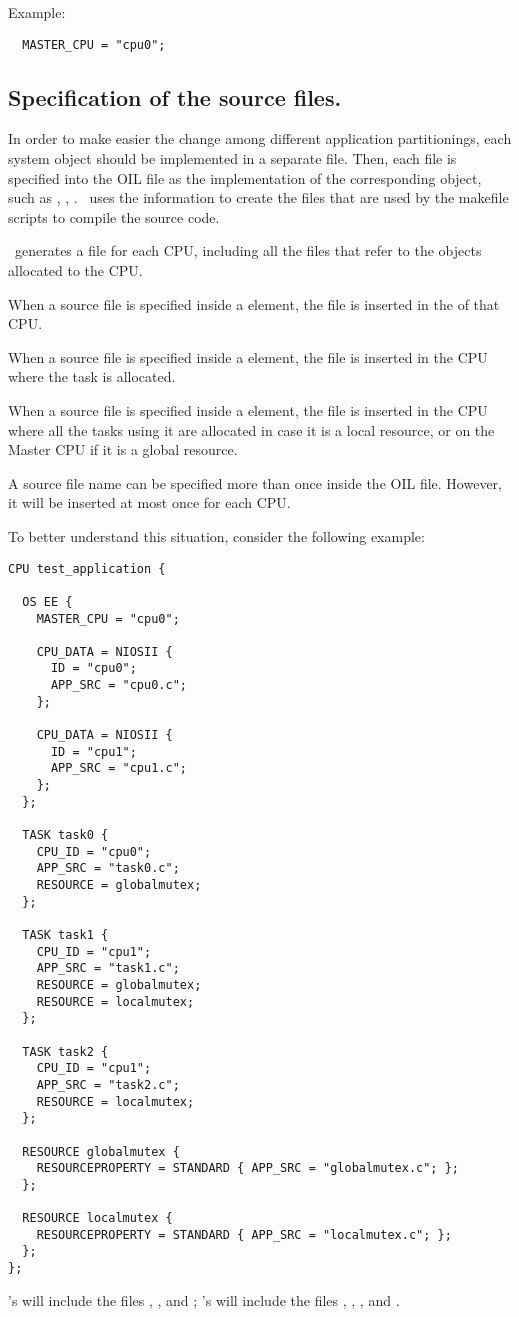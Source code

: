 Example:
\begin{lstlisting}
  MASTER_CPU = "cpu0";
\end{lstlisting}




\subsection{Specification of the source files.}

In order to make easier the change among different application 
partitionings, each
system object should be implemented in a separate file. Then, each
file is specified into the OIL file as the implementation of the
corresponding object, such as , ,
. \rtd\ uses the information to create the
 files that are used by the makefile scripts to
compile the source code.

\rtd\ generates a  file for each CPU, including all
the files that refer to the objects allocated to the CPU.

When a source file is specified inside a  element, the
file is inserted in the  of that CPU.

When a source file is specified inside a  element, the
file is inserted in the CPU where the task is allocated.

When a source file is specified inside a  element, the
file is inserted in the CPU where all the tasks using it are allocated
in case it is a local resource, or on the Master CPU if it is a global
resource.

A source file name can be specified more than once inside the OIL
file. However, it will be inserted at most once for each CPU.

To better understand this situation, consider the following example:

\begin{lstlisting}
CPU test_application {

  OS EE {
    MASTER_CPU = "cpu0";			

    CPU_DATA = NIOSII {
      ID = "cpu0";
      APP_SRC = "cpu0.c";
    };

    CPU_DATA = NIOSII {
      ID = "cpu1";
      APP_SRC = "cpu1.c";
    };
  };

  TASK task0 {
    CPU_ID = "cpu0";
    APP_SRC = "task0.c";
    RESOURCE = globalmutex;
  };

  TASK task1 {
    CPU_ID = "cpu1";
    APP_SRC = "task1.c";
    RESOURCE = globalmutex;
    RESOURCE = localmutex;
  };

  TASK task2 {
    CPU_ID = "cpu1";
    APP_SRC = "task2.c";
    RESOURCE = localmutex;
  };
  
  RESOURCE globalmutex {
    RESOURCEPROPERTY = STANDARD { APP_SRC = "globalmutex.c"; };
  };

  RESOURCE localmutex {
    RESOURCEPROPERTY = STANDARD { APP_SRC = "localmutex.c"; };
  };
};
\end{lstlisting}

's  will include the files
, , and ;
's  will include the files ,
, , and .



